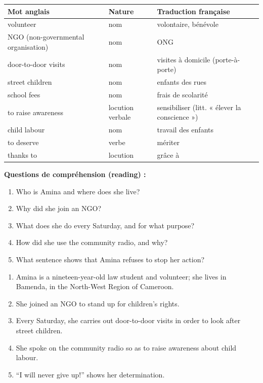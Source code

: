 \documentclass[11pt]{article}
\begin{document}
\begin{center}
\begin{tabularx}{\linewidth}{|l|l|X|}
\hline
\rowcolor{popblueL} Mot anglais & Nature & Traduction française \\
\hline
volunteer & nom & volontaire, bénévole \\
\hline
NGO (non-governmental organisation) & nom & ONG \\
\hline
door-to-door visits & nom & visites à domicile (porte-à-porte) \\
\hline
street children & nom & enfants des rues \\
\hline
school fees & nom & frais de scolarité \\
\hline
to raise awareness & locution verbale & sensibiliser (litt. « élever la conscience ») \\
\hline
child labour & nom & travail des enfants \\
\hline
to deserve & verbe & mériter \\
\hline
thanks to & locution & grâce à \\
\hline
\end{tabularx}
\end{center}

\textbf{Questions de compréhension (reading) :}
\begin{enumerate}
\item Who is Amina and where does she live?
\item Why did she join an NGO?
\item What does she do every Saturday, and for what purpose?
\item How did she use the community radio, and why?
\item What sentence shows that Amina refuses to stop her action?
\end{enumerate}

\begin{corrige}
\begin{enumerate}
\item Amina is a nineteen-year-old law student and volunteer; she lives in Bamenda, in the North-West Region of Cameroon.
\item She joined an NGO to stand up for children's rights.
\item Every Saturday, she carries out door-to-door visits in order to look after street children.
\item She spoke on the community radio so as to raise awareness about child labour.
\item “I will never give up!” shows her determination.
\end{enumerate}
\end{corrige}
\end{document}
